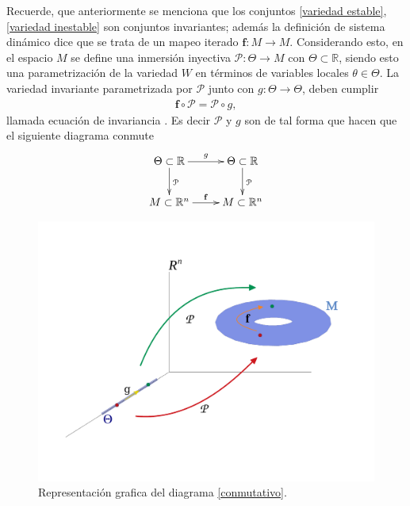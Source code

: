 Recuerde, que anteriormente se menciona que los conjuntos \eqref{variedad estable}, \eqref{variedad inestable} son conjuntos invariantes; además la definición de sistema dinámico dice que se trata de un mapeo iterado $\mathbf{f}:M \rightarrow M$. Considerando esto, en el espacio $M$ se define una inmersión inyectiva $\mathcal{P}:\Theta \rightarrow M$ con $\Theta\subset \mathbb{R}$, siendo esto una parametrización de la variedad $W$ en términos de variables locales $\theta \in \Theta$. La variedad invariante parametrizada por $\mathcal{P}$ junto con $g:\Theta \rightarrow \Theta$, deben cumplir 
\begin{eqnarray}
\mathbf{f} \circ \mathcal{P} =\mathcal{P}  \circ g,  \label{Ecua de invariancia}
\end{eqnarray}
llamada ecuación de invariancia \cite{Haro}.
Es decir $\mathcal{P}$ y $g$ son de tal forma que hacen que el siguiente diagrama conmute
\begin{eqnarray}
\xymatrix{
\Theta\subset\mathbb{R} \ar[d]^{\mathcal{P}} \ar[r]^{g} & \Theta\subset\mathbb{R} \ar[d]^{\mathcal{P}} \\
M\subset\mathbb{R}^{n} \ar[r]^{\mathbf{f}} & M\subset\mathbb{R}^{n}
}\label{conmutativo}
\end{eqnarray}

\begin{figure}[h!]
	\centering
	\includegraphics[scale=0.4]{diagrama-conmutativo}
	\caption{Representación grafica del diagrama \eqref{conmutativo}.}
	\label{diagrama-conmutativo}
\end{figure}


